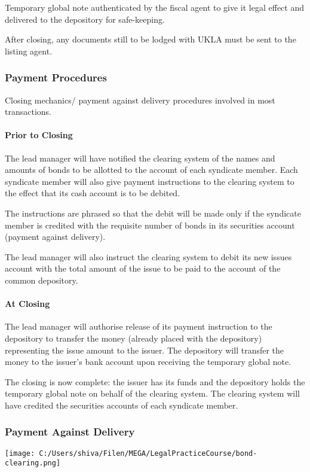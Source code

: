 \documentclass[
]{article}
\begin{document}
Temporary global note authenticated by the fiscal agent to give it legal
effect and delivered to the depository for safe-keeping.

After closing, any documents still to be lodged with UKLA must be sent
to the listing agent.

\hypertarget{payment-procedures}{%
\subsubsection{Payment Procedures}\label{payment-procedures}}

Closing mechanics/ payment against delivery procedures involved in most
transactions.

\hypertarget{prior-to-closing}{%
\paragraph{Prior to Closing}\label{prior-to-closing}}

The lead manager will have notified the clearing system of the names and
amounts of bonds to be allotted to the account of each syndicate member.
Each syndicate member will also give payment instructions to the
clearing system to the effect that its cash account is to be debited.

The instructions are phrased so that the debit will be made only if the
syndicate member is credited with the requisite number of bonds in its
securities account (payment against delivery).

The lead manager will also instruct the clearing system to debit its new
issues account with the total amount of the issue to be paid to the
account of the common depository.

\hypertarget{at-closing}{%
\paragraph{At Closing}\label{at-closing}}

The lead manager will authorise release of its payment instruction to
the depository to transfer the money (already placed with the
depository) representing the issue amount to the issuer. The depository
will transfer the money to the issuer's bank account upon receiving the
temporary global note.

The closing is now complete: the issuer has its funds and the depository
holds the temporary global note on behalf of the clearing system. The
clearing system will have credited the securities accounts of each
syndicate member.

\hypertarget{payment-against-delivery}{%
\subsubsection{Payment Against
Delivery}\label{payment-against-delivery}}

\texttt{[image: C:/Users/shiva/Filen/MEGA/LegalPracticeCourse/bond-clearing.png]}
\end{document}
